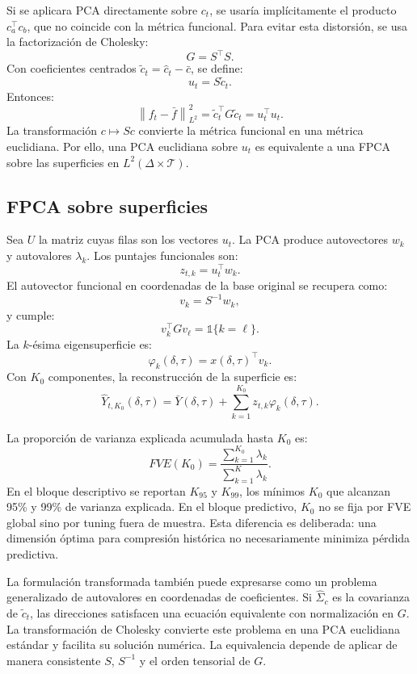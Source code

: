 \documentclass[a4paper,11pt]{article}
\newcommand{\norm}[1]{\left\lVert #1 \right\rVert}
\begin{document}
Si se aplicara PCA directamente sobre \(c_t\), se usaría implícitamente el producto \(c_a^\top c_b\), que no coincide con la métrica funcional. Para evitar esta distorsión, se usa la factorización de Cholesky:
\[
  G=S^\top S.
\]
Con coeficientes centrados \(\widetilde c_t=\widehat c_t-\bar c\), se define:
\[
  u_t=S\widetilde c_t.
\]
Entonces:
\[
  \norm{f_t-\bar f}_{L^2}^2
  =
  \widetilde c_t^\top G\widetilde c_t
  =
  u_t^\top u_t.
\]
La transformación \(c\mapsto Sc\) convierte la métrica funcional en una métrica euclidiana. Por ello, una PCA euclidiana sobre \(u_t\) es equivalente a una FPCA sobre las superficies en \(L^2(\Delta\times \mathcal{T})\).

\subsection{FPCA sobre superficies}

Sea \(U\) la matriz cuyas filas son los vectores \(u_t\). La PCA produce autovectores \(w_k\) y autovalores \(\lambda_k\). Los puntajes funcionales son:
\[
  z_{t,k}=u_t^\top w_k.
\]
El autovector funcional en coordenadas de la base original se recupera como:
\[
  v_k=S^{-1}w_k,
\]
y cumple:
\[
  v_k^\top Gv_\ell=\mathbb{1}\{k=\ell\}.
\]
La \(k\)-ésima eigensuperficie es:
\[
  \varphi_k(\delta,\tau)=x(\delta,\tau)^\top v_k.
\]
Con \(K_0\) componentes, la reconstrucción de la superficie es:
\[
  \widehat Y_{t,K_0}(\delta,\tau)
  =
  \bar Y(\delta,\tau)+\sum_{k=1}^{K_0}z_{t,k}\varphi_k(\delta,\tau).
\]

La proporción de varianza explicada acumulada hasta \(K_0\) es:
\[
  FVE(K_0)=\frac{\sum_{k=1}^{K_0}\lambda_k}{\sum_{k=1}^{K}\lambda_k}.
\]
En el bloque descriptivo se reportan \(K_{95}\) y \(K_{99}\), los mínimos \(K_0\) que alcanzan 95\% y 99\% de varianza explicada. En el bloque predictivo, \(K_0\) no se fija por FVE global sino por tuning fuera de muestra. Esta diferencia es deliberada: una dimensión óptima para compresión histórica no necesariamente minimiza pérdida predictiva.

La formulación transformada también puede expresarse como un problema generalizado de autovalores en coordenadas de coeficientes. Si \(\widehat\Sigma_c\) es la covarianza de \(\widetilde c_t\), las direcciones satisfacen una ecuación equivalente con normalización en \(G\). La transformación de Cholesky convierte este problema en una PCA euclidiana estándar y facilita su solución numérica. La equivalencia depende de aplicar de manera consistente \(S\), \(S^{-1}\) y el orden tensorial de \(G\).
\end{document}
